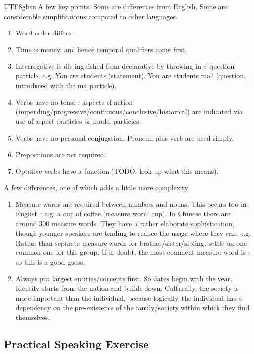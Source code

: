 \documentclass{article}
\newcommand{\myfont}{gbsn} %
\begin{document}
\begin{CJK}{UTF8}{\myfont}
A few key points.   Some are differences from English.  Some are considerable simplifications compared to other languages.

\begin{enumerate}
\item Word order differs.
\item Time is money, and hence temporal qualifiers come first.
\item Interrogative is distinguished from declarative by throwing in a question particle.  e.g. You are students (statement).  You are students ma? (question, introduced with the ma particle).
\item Verbs have no tense : aspects of action (impending/progressive/continuous/conclusive/historical) are indicated via use of aspect particles or model particles.
\item Verbs have no personal conjugation.  Pronoun plus verb are used simply.
\item Prepositions are not required.
\item Optative verbs have a function (TODO: look up what this means).
\end{enumerate}

A few differences, one of which adds a little more complexity:

\begin{enumerate}
\item Measure words are required between numbers and nouns.  This occurs too in English : e.g. a cup of coffee (measure word: cup).   In Chinese there are around 300 measure words. They have a rather elaborate sophistication, though younger speakers are tending to reduce the usage where they can. e.g. Rather than separate measure words for brother/sister/sibling, settle on one common one for this group.  If in doubt, the most comment measure word is  - so this is a good guess.
\item Always put largest entities/concepts first.  So dates begin with the year.  Identity starts from the nation and builds down.  Culturally, the society is more important than the individual, because logically, the individual has a dependency on the pre-existence of the family/society within which they find themselves.
\end{enumerate}

\subsection{Practical Speaking Exercise}


\end{CJK}
\end{document}
